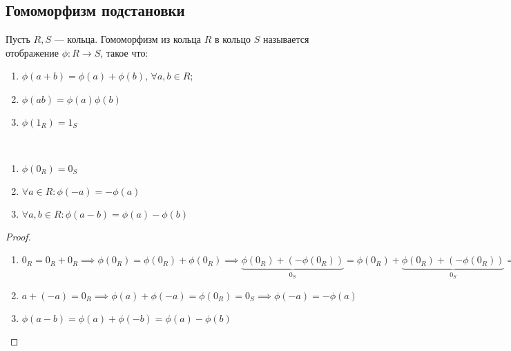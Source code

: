 \subsection{Гомоморфизм подстановки}

\begin{defn}
    Пусть $R, S$ --- кольца. Гомоморфизм из кольца $R$ в кольцо $S$ называется отображение $\phi: R \to S$, такое что:

    \begin{enumerate}
        \item $\phi(a + b) = \phi(a) + \phi(b)$, $\forall a, b \in R$;
        
        \item $\phi(ab) = \phi(a) \phi(b)$
        
        \item $\phi(1_R) = 1_S$
    \end{enumerate}
\end{defn}

\begin{theorem-non} ~

    \begin{enumerate}    
        \item $\phi(0_R) = 0_S$
        
        \item $\forall a \in R: \phi(-a) = -\phi(a)$
        
        \item $\forall a, b \in R: \phi(a - b) = \phi(a) - \phi(b)$ 
    \end{enumerate}
\end{theorem-non}

\begin{proof}
    \begin{enumerate}
        \item $0_R = 0_R + 0_R \implies \phi(0_R) = \phi(0_R) + \phi(0_R) \implies \underbrace{\phi(0_R) + (-\phi(0_R))}_{0_S} = \phi(0_R) + \underbrace{\phi(0_R) + (-\phi(0_R))}_{0_S} \implies 0_S = \phi(0_R) + 0_S \implies \phi(0_R) = 0_S$

        \item $a + (-a) = 0_R \implies \phi(a) + \phi(-a) = \phi(0_R) = 0_S \implies \phi(-a) = -\phi(a)$
        
        \item $\phi(a - b) = \phi(a) + \phi(-b) = \phi(a) - \phi(b)$
    \end{enumerate}
\end{proof}

